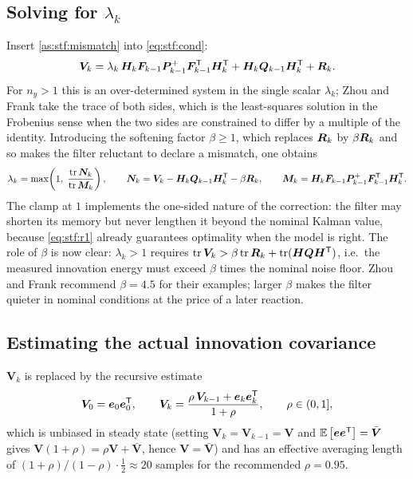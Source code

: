 \subsection{Solving for $\lambda_k$}
Insert \cref{as:stf:mismatch} into \eqref{eq:stf:cond}:
\begin{equation}
\bm{V}_k = \lambda_k\,\bm{H}_k\bm{F}_{k-1}\bm{P}^{+}_{k-1}\bm{F}_{k-1}^{\mathsf{T}}\bm{H}_k^{\mathsf{T}} + \bm{H}_k\bm{Q}_{k-1}\bm{H}_k^{\mathsf{T}} + \bm{R}_k .
\label{eq:stf:sub}
\end{equation}
For $n_y>1$ this is an over-determined system in the single scalar $\lambda_k$; Zhou and Frank take
the trace of both sides, which is the least-squares solution in the Frobenius sense when the two
sides are constrained to differ by a multiple of the identity.  Introducing the softening factor
$\beta\ge 1$, which replaces $\bm{R}_k$ by $\beta\bm{R}_k$ and so makes the filter reluctant to declare a
mismatch, one obtains
\begin{equation}
\lambda_k = \max\!\left(1,\; \frac{\operatorname{tr}\bm{N}_k}{\operatorname{tr}\bm{M}_k}\right), \qquad
\bm{N}_k = \bm{V}_k - \bm{H}_k\bm{Q}_{k-1}\bm{H}_k^{\mathsf{T}} - \beta\bm{R}_k, \qquad
\bm{M}_k = \bm{H}_k\bm{F}_{k-1}\bm{P}^{+}_{k-1}\bm{F}_{k-1}^{\mathsf{T}}\bm{H}_k^{\mathsf{T}} .
\label{eq:stf:lambda}
\end{equation}
The clamp at $1$ implements the one-sided nature of the correction: the filter may shorten its
memory but never lengthen it beyond the nominal Kalman value, because \eqref{eq:stf:r1} already
guarantees optimality when the model is right.  The role of $\beta$ is now clear: $\lambda_k>1$
requires $\operatorname{tr}\bm{V}_k > \beta\operatorname{tr}\bm{R}_k + \operatorname{tr}(\bm{H}\bm{Q}\bm{H}^{\mathsf{T}})$, i.e.\ the measured innovation energy must
exceed $\beta$ times the nominal noise floor.  Zhou and Frank recommend $\beta = 4.5$ for their
examples; larger $\beta$ makes the filter quieter in nominal conditions at the price of a later
reaction.

\subsection{Estimating the actual innovation covariance}
$\bm{V}_k$ is replaced by the recursive estimate
\begin{equation}
\bm{V}_0 = \bm{e}_0\bm{e}_0^{\mathsf{T}}, \qquad
\bm{V}_k = \frac{\rho\,\bm{V}_{k-1} + \bm{e}_k\bm{e}_k^{\mathsf{T}}}{1+\rho},\qquad \rho\in(0,1],
\label{eq:stf:V}
\end{equation}
which is unbiased in steady state (setting $\bm{V}_k=\bm{V}_{k-1}=\bm{V}$ and
$\mathbb{E}\left[\bm{e}\bm{e}^{\mathsf{T}}\right]=\bar{\bm{V}}$ gives $\bm{V}(1+\rho)=\rho\bm{V}+\bar{\bm{V}}$, hence $\bm{V}=\bar{\bm{V}}$) and has an
effective averaging length of $(1+\rho)/(1-\rho)\cdot\tfrac12\approx 20$ samples for the
recommended $\rho=0.95$.

